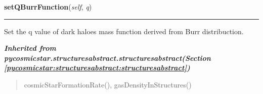     \label{pycosmicstar:structures:structures:setQBurrFunction}

    \vspace{0.5ex}

\hspace{.8\funcindent}\begin{boxedminipage}{\funcwidth}

    \raggedright \textbf{setQBurrFunction}(\textit{self}, \textit{q})

    \vspace{-1.5ex}

    \rule{\textwidth}{0.5\fboxrule}
\setlength{\parskip}{2ex}
    Set the q value of dark haloes mass function derived from Burr 
    distribuction.

\setlength{\parskip}{1ex}
    \end{boxedminipage}


\large{\textbf{\textit{Inherited from pycosmicstar.structuresabstract.structuresabstract\textit{(Section \ref{pycosmicstar:structuresabstract:structuresabstract})}}}}

\begin{quote}
cosmicStarFormationRate(), gasDensityInStructures()
\end{quote}
